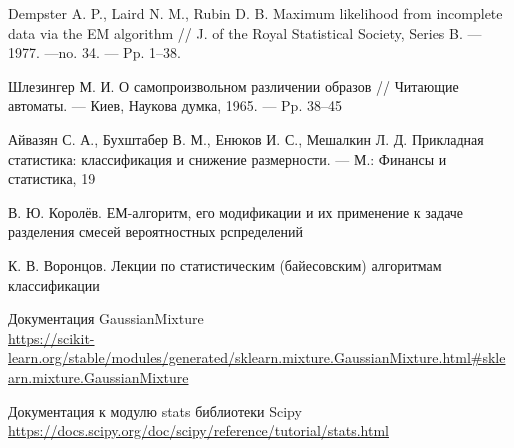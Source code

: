 \begin{thebibliography}{99}

 Dempster A. P., Laird N. M., Rubin D. B. Maximum likelihood from incomplete data via the EM algorithm // J. of the Royal Statistical Society, Series B. — 1977. —no. 34. — Pp. 1–38.

 Шлезингер М. И. О самопроизвольном различении образов // Читающие автоматы. — Киев, Наукова думка, 1965. — Pp. 38–45

 Айвазян С. А., Бухштабер В. М., Енюков И. С., Мешалкин Л. Д. Прикладная статистика: классификация и снижение размерности. — М.: Финансы и статистика, 19

 В. Ю. Королёв. ЕМ-алгоритм, его модификации и их применение к задаче разделения смесей вероятностных рспределений

 К. В. Воронцов. Лекции по статистическим (байесовским) алгоритмам классификации

 Документация GaussianMixture \\ \url{https://scikit-learn.org/stable/modules/generated/sklearn.mixture.GaussianMixture.html#sklearn.mixture.GaussianMixture}

 Документация к модулю stats библиотеки Scipy \\ \url{https://docs.scipy.org/doc/scipy/reference/tutorial/stats.html}

\end{thebibliography}